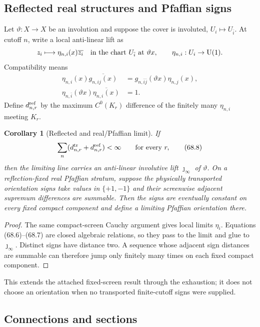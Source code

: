 \documentclass[11pt]{article}
\newtheorem{corollary}[theorem]{Corollary}
\theoremstyle{remark}
\begin{document}
\subsection{Reflected real structures and Pfaffian signs}

Let \(\vartheta:X\to X\) be an involution and suppose the cover is
involuted, \(U_i\mapsto U_{\bar i}\).  At cutoff \(n\), write a local
anti-linear lift as
\[
 z_i\longmapsto
 \eta_{n,i}(x)\overline{z_i}
 \quad\text{in the chart }U_{\bar i}\text{ at }\vartheta x,
 \qquad \eta_{n,i}:U_i\to{\rm U}(1).
\]
Compatibility means
\begin{align}
 \eta_{n,i}(x)\overline{g_{n,ij}(x)}
 &=
 g_{n,\bar i\bar j}(\vartheta x)\eta_{n,j}(x),     \tag{68.6}\\
 \eta_{n,\bar i}(\vartheta x)\overline{\eta_{n,i}(x)}
 &=1.                                             \tag{68.7}
\end{align}
Define \(d_{n,r}^{\rm ref}\) by the maximum \(C^0(K_r)\) difference
of the finitely many \(\eta_{n,i}\) meeting \(K_r\).

\begin{corollary}[Reflected and real/Pfaffian limit]
\label{cor:v12v68-real-limit}
If
\[
 \sum_n(d_{n,r}^{\rm tr}+d_{n,r}^{\rm ref})<\infty
 \qquad\text{for every }r,                        \tag{68.8}
\]
then the limiting line carries an anti-linear involutive lift
\(\jmath_\infty\) of \(\vartheta\).  On a reflection-fixed real
Pfaffian stratum, suppose the physically transported orientation
signs take values in \(\{+1,-1\}\) and their screenwise adjacent
supremum differences are summable.  Then the signs are eventually
constant on every fixed compact component and define a limiting
Pfaffian orientation there.
\end{corollary}

\begin{proof}
The same compact-screen Cauchy argument gives local limits
\(\eta_i\).  Equations (68.6)--(68.7) are closed algebraic
relations, so they pass to the limit and glue to
\(\jmath_\infty\).  Distinct signs have distance two.  A sequence
whose adjacent sign distances are summable can therefore jump only
finitely many times on each fixed compact component.
\end{proof}

This extends the attached fixed-screen result through the
exhaustion; it does not choose an orientation when no transported
finite-cutoff signs were supplied.

\subsection{Connections and sections}
\end{document}
